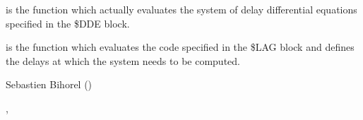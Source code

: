 %
\begin{Details}\relax
{} is the function which actually evaluates the system of delay
differential equations specified in the \$DDE block.

 is the function which evaluates the code specified in the \$LAG 
block and defines the delays at which the system needs to be computed.

\end{Details}
%
\begin{Author}\relax
Sebastien Bihorel ()
\end{Author}
%
\begin{SeeAlso}\relax
{}, 
\end{SeeAlso}
